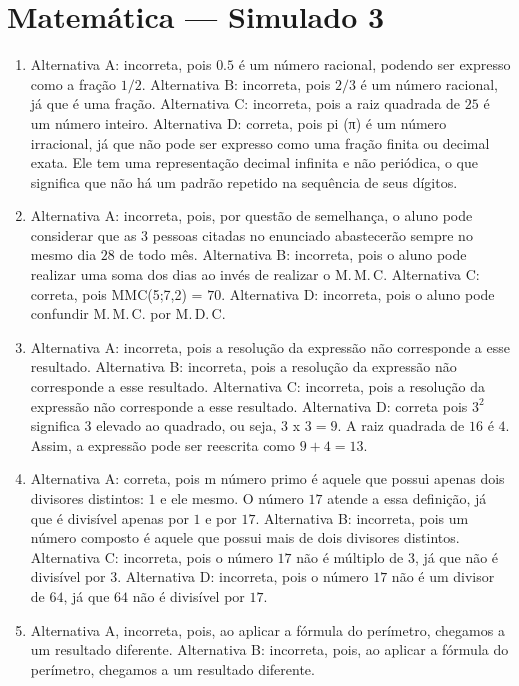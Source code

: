 \section*{Matemática — Simulado 3}

\begin{enumerate}
\item Alternativa A: incorreta, pois $0.5$ é um número racional, podendo ser
expresso como a fração $1/2$. Alternativa B: incorreta, pois $2/3$ é um
número racional, já que é uma fração. Alternativa C: incorreta, pois a
raiz quadrada de $25$ é um número inteiro. Alternativa D: correta, pois pi
(π) é um número irracional, já que não pode ser expresso como uma fração
finita ou decimal exata. Ele tem uma representação decimal infinita e
não periódica, o que significa que não há um padrão repetido na
sequência de seus dígitos.
\item Alternativa A: incorreta, pois, por questão de semelhança, o aluno pode
considerar que as $3$ pessoas citadas no enunciado abastecerão sempre no
mesmo dia $28$ de todo mês.
Alternativa B: incorreta, pois o aluno pode realizar uma soma dos dias
ao invés de realizar o M.\,M.\,C.
Alternativa C: correta, pois MMC(5;7,2) = $70$. 
Alternativa D: incorreta, pois o aluno pode confundir M.\,M.\,C. por M.\,D.\,C.
\item Alternativa A: incorreta, pois a resolução da expressão não corresponde
a esse resultado.
Alternativa B: incorreta, pois a resolução da expressão não corresponde
a esse resultado.
Alternativa C: incorreta, pois a resolução da expressão não corresponde
a esse resultado.
Alternativa D: correta pois $3^2$ significa $3$ elevado ao quadrado, ou seja,
3 x $3 = 9$. A raiz quadrada de $16$ é $4$. Assim, a expressão pode ser
reescrita como $9 + 4 = 13$.
\item Alternativa A: correta, pois m número primo é aquele que possui apenas
dois divisores distintos: $1$ e ele mesmo. O número $17$ atende a essa
definição, já que é divisível apenas por $1$ e por $17$.
Alternativa B: incorreta, pois um número composto é aquele que possui
mais de dois divisores distintos.
Alternativa C: incorreta, pois o número $17$ não é múltiplo de $3$, já que
não é divisível por $3$.
Alternativa D: incorreta, pois o número $17$ não é um divisor de $64$, já
que $64$ não é divisível por $17$.
\item Alternativa A, incorreta, pois, ao aplicar a fórmula do perímetro,
chegamos a um resultado diferente.
Alternativa B: incorreta, pois, ao aplicar a fórmula do perímetro,
chegamos a um resultado diferente.

\end{enumerate}
